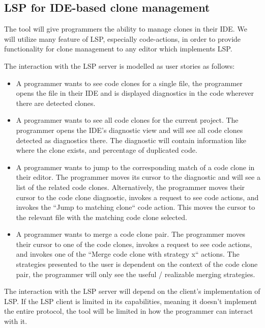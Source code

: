 \documentclass[12pt]{article}
\begin{document}
\subsection{LSP for IDE-based clone management}

The tool will give programmers the ability to manage clones in their IDE. We will utilize
many feature of LSP, especially code-actions, in order to provide functionality for clone
management to any editor which implements LSP.

The interaction with the LSP server is modelled as user stories as follows:

\begin{itemize}
	\item A programmer wants to see code clones for a single file, the
	      programmer opens the file in their IDE and is displayed diagnostics in the code
	      wherever there are detected clones.

	\item A programmer wants to see all code clones for the current project. The
	      programmer opens the IDE's diagnostic view and will see all code clones detected
	      as diagnostics there. The diagnostic will contain information like where the clone
	      exists, and percentage of duplicated code.

    \item A programmer wants to jump to the corresponding match of a code clone in their
        editor. The programmer moves its cursor to the diagnostic and will see a list of
        the related code clones. Alternatively, the programmer moves their cursor to the
        code clone diagnostic, invokes a request to see code actions, and invokes the
        ``Jump to matching clone`` code action. This moves the cursor to the relevant file
        with the matching code clone selected. 

	\item A programmer wants to merge a code clone pair. The programmer moves their cursor
	      to one of the code clones, invokes a request to see code actions, and invokes one
	      of the ``Merge code clone with strategy x`` actions. The strategies presented to
	      the user is dependent on the context of the code clone pair, the programmer will
	      only see the useful / realizable merging strategies.
\end{itemize}

The interaction with the LSP server will depend on the client's implementation of LSP. If
the LSP client is limited in its capabilities, meaning it doesn't implement the entire
protocol, the tool will be limited in how the programmer can interact with it.
\end{document}
